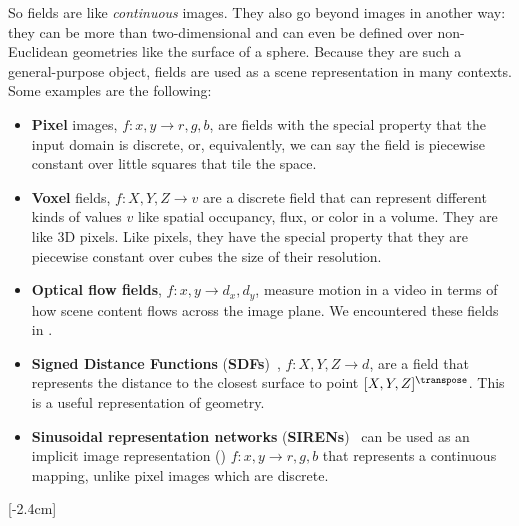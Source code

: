 So fields are like \textit{continuous} images. They also go beyond images in another way: they can be more than two-dimensional and can even be defined over non-Euclidean geometries like the surface of a sphere. Because they are such a general-purpose object, fields are used as a scene representation in many contexts. Some examples are the following:
\begin{itemize}
    \item {}\textbf{Pixel} images, $f: x, y \rightarrow r, g, b$, are fields with the special property that the input domain is discrete, or, equivalently, we can say the field is piecewise constant over little squares that tile the space.
    \item {}\textbf{Voxel} fields, $f: X,Y,Z \rightarrow v$ are a discrete field that can represent different kinds of values $v$ like spatial occupancy, flux, or color in a volume. They are like 3D pixels. Like pixels, they have the special property that they are piecewise constant over cubes the size of their resolution.
    \item {}\textbf{Optical flow fields}, $f: x, y \rightarrow d_x, d_y$, measure motion in a video in terms of how scene content flows across the image plane. We encountered these fields in \chap{\ref{chapter:3D_motion_and_its_2D_projection}}.
    \item {}\textbf{Signed Distance Functions} (\textbf{SDFs})~\cite{curless1996volumetric}, $f: X,Y,Z \rightarrow d$, are a field that represents the distance to the closest surface to point $[X,Y,Z]^\transpose$. This is a useful representation of geometry.
    \item {}\textbf{Sinusoidal representation networks} (\textbf{SIRENs})~\cite{sitzmann2019siren} can be used as an implicit image representation (\sect{\ref{sec:implicit_image_representations}}) $f: x, y \rightarrow r, g, b$ that represents a continuous mapping, unlike pixel images which are discrete.
\end{itemize}
[-2.4cm]

